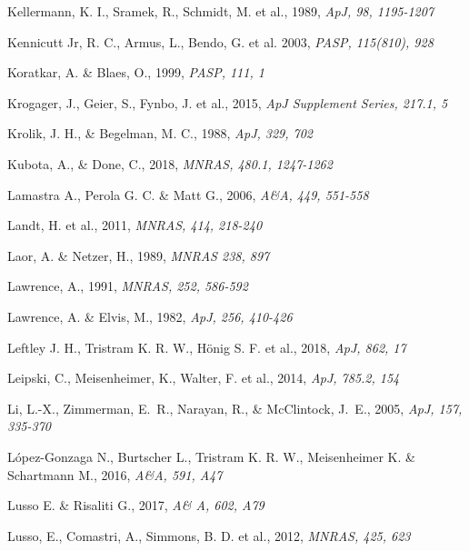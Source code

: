 \documentclass[]{aa}
\begin{document}
\begin{thebibliography}{}
Kellermann, K. I., Sramek, R., Schmidt, M. et al., 1989,
\newblock \emph{ApJ, 98, 1195-1207}

Kennicutt Jr, R. C., Armus, L., Bendo, G. et al.  2003,
\newblock \emph{PASP, 115(810), 928}

Koratkar, A. \& Blaes, O., 1999,
\newblock \emph{PASP, 111, 1}

Krogager, J., Geier, S., Fynbo, J. et al., 2015,
\newblock \emph{ApJ Supplement Series, 217.1, 5}

Krolik, J. H., \& Begelman, M. C., 1988,
\newblock \emph{ApJ, 329, 702}

Kubota, A., \& Done, C., 2018, 
\newblock \emph{MNRAS, 480.1, 1247-1262}

Lamastra A., Perola G. C. \& Matt G., 2006,
\newblock \emph{A\&A, 449, 551-558}

Landt, H. et al., 2011,
\newblock \emph{MNRAS, 414, 218-240}

Laor, A. \& Netzer, H., 1989,
\newblock \emph{MNRAS 238, 897}

Lawrence, A., 1991, 
\newblock \emph{MNRAS, 252, 586-592}

Lawrence, A. \& Elvis, M., 1982, 
\newblock \emph{ApJ, 256, 410-426}

Leftley J. H., Tristram K. R. W., H\"{o}nig S. F. et al., 2018,
\newblock \emph{ApJ, 862, 17}

Leipski, C., Meisenheimer, K., Walter, F. et al., 2014,
\newblock \emph{ApJ, 785.2, 154}

Li, L.-X., Zimmerman, E.~R., Narayan, R., \& McClintock, J.~E., 2005,
\newblock \emph{ApJ, 157, 335-370}

López-Gonzaga N., Burtscher L., Tristram K. R. W., Meisenheimer K. \& Schartmann M., 2016,
\newblock \emph{A\&A, 591, A47}

Lusso E. \& Risaliti G., 2017, 
\newblock \emph{A\& A, 602, A79}

Lusso, E., Comastri, A., Simmons, B. D. et al., 2012,
\newblock \emph{MNRAS, 425, 623}


\end{thebibliography}
\end{document}
